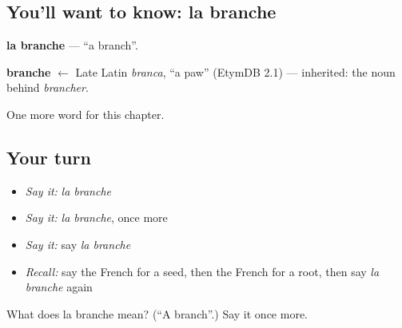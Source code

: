 \subsection*{You'll want to know: la branche}
\textbf{la branche} — \textquotedblleft{}a branch\textquotedblright{}.

\begin{cousinweb}
\textbf{branche} $\leftarrow$ Late Latin \emph{branca}, \textquotedblleft{}a paw\textquotedblright{} (EtymDB 2.1) — inherited: the noun behind \emph{brancher}.
\end{cousinweb}

\begin{grammarlens}[title={What you've built}]
One more word for this chapter.
\end{grammarlens}

\subsection*{Your turn}
\begin{itemize}
\raggedright
  \item \emph{Say it:} \emph{la branche}
  \item \emph{Say it:} \emph{la branche}, once more
  \item \emph{Say it:} say \emph{la branche}
  \item \emph{Recall:} say the French for a seed, then the French for a root, then say \emph{la branche} again
\end{itemize}

\begin{tcolorbox}[breakable,colback=teal!4,colframe=teal!35!black,title={Before you move on}]
What does la branche mean? (\textquotedblleft{}A branch\textquotedblright{}.) Say it once more.
\end{tcolorbox}
